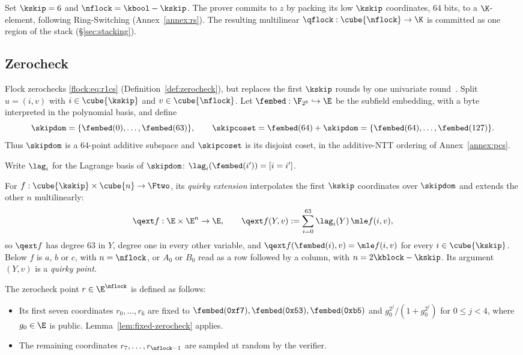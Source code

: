 Set $\kskip=6$ and $\nflock=\kbool-\kskip$. The prover commits to $z$ by packing its low $\kskip$ coordinates, $64$ bits, to a $\K$-element, following Ring-Switching (Annex~\ref{annex:rs}). The resulting multilinear $\qflock:\cube{\nflock}\to\K$ is committed as one region of the stack (\S\ref{sec:stacking}).


\subsection{Zerocheck}\label{flock:zerocheck}

Flock zerochecks \eqref{flock:eq:r1cs} (Definition~\ref{def:zerocheck}), but replaces the first $\kskip$ rounds by one univariate round~\cite{Gru24}. Split $u=(i,v)$ with $i\in\cube{\kskip}$ and $v\in\cube{\nflock}$. Let $\fembed:\F_{2^8}\hookrightarrow\E$ be the subfield embedding, with a byte interpreted in the polynomial basis, and define
\[
\skipdom=\{\fembed(0),\ldots,\fembed(63)\},\qquad \skipcoset=\fembed(64)+\skipdom=\{\fembed(64),\ldots,\fembed(127)\}.
\]
Thus $\skipdom$ is a $64$-point additive subspace and $\skipcoset$ is its disjoint coset, in the additive-NTT ordering of Annex~\ref{annex:pcs}.

Write $\lag_i$ for the Lagrange basis of $\skipdom$: $\lag_i(\fembed(i'))=[i=i']$.

\begin{definition}\label{def:quirky}
For $f:\cube{\kskip}\times\cube{n}\to\Ftwo$, its \emph{quirky extension} interpolates the first $\kskip$ coordinates over $\skipdom$ and extends the other $n$ multilinearly:
\[
  \qext f:\E\times\E^{n}\to\E,\qquad
  \qext f(Y,v):=\sum_{i=0}^{63}\lag_i(Y)\,\mle f(i,v),
\]
so $\qext f$ has degree $63$ in $Y$, degree one in every other variable, and $\qext f(\fembed(i),v)=\mle f(i,v)$ for every $i\in\cube{\kskip}$. Below $f$ is $a$, $b$ or $c$, with $n=\nflock$, or $A_0$ or $B_0$ read as a row followed by a column, with $n=2\kblock-\kskip$. Its argument $(Y,v)$ is a \emph{quirky point}.
\end{definition}

The zerocheck point $r \in \E^{\nflock}$ is defined as follows:
\begin{itemize}
  \item Its first seven coordinates $r_0, \dots, r_6$ are fixed to $\fembed(\mathtt{0xf7}),\fembed(\mathtt{0x53}),\fembed(\mathtt{0xb5})$ and $g_0^{2^j}/(1+g_0^{2^j})$ for $0\leq j<4$, where $g_0\in\E$ is public. Lemma~\ref{lem:fixed-zerocheck} applies.
  \item The remaining coordinates $r_7,\dots,r_{\nflock-1}$ are sampled at random by the verifier.
\end{itemize}

